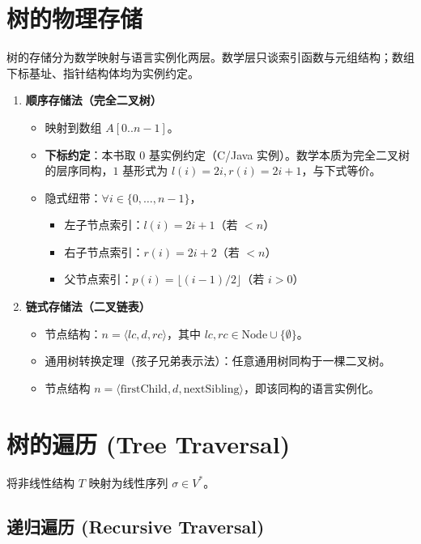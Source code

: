 \section{树的物理存储}

树的存储分为数学映射与语言实例化两层。数学层只谈索引函数与元组结构；数组下标基址、指针结构体均为实例约定。

\begin{enumerate}
    \item \textbf{顺序存储法（完全二叉树）}
    \begin{itemize}
        \item 映射到数组 $A[0..n-1]$。
        \item \textbf{下标约定}：本书取 $0$ 基实例约定（C/Java 实例）。数学本质为完全二叉树的层序同构，$1$ 基形式为 $l(i)=2i, r(i)=2i+1$，与下式等价。
        \item 隐式纽带：$\forall i \in \{0, \dots, n-1\}$，
        \begin{itemize}
            \item 左子节点索引：$l(i) = 2i + 1$（若 $< n$）
            \item 右子节点索引：$r(i) = 2i + 2$（若 $< n$）
            \item 父节点索引：$p(i) = \lfloor (i-1)/2 \rfloor$（若 $i > 0$）
        \end{itemize}
    \end{itemize}
    \item \textbf{链式存储法（二叉链表）}
    \begin{itemize}
        \item 节点结构：$n = \langle lc, d, rc \rangle$，其中 $lc, rc \in \text{Node} \cup \{\emptyset\}$。
        \item 通用树转换定理（孩子兄弟表示法）：任意通用树同构于一棵二叉树。
        \item 节点结构 $n = \langle \text{firstChild}, d, \text{nextSibling} \rangle$，即该同构的语言实例化。
    \end{itemize}
\end{enumerate}

\section{树的遍历 (Tree Traversal)}

将非线性结构 $T$ 映射为线性序列 $\sigma \in V^*$。

\subsection{递归遍历 (Recursive Traversal)}

